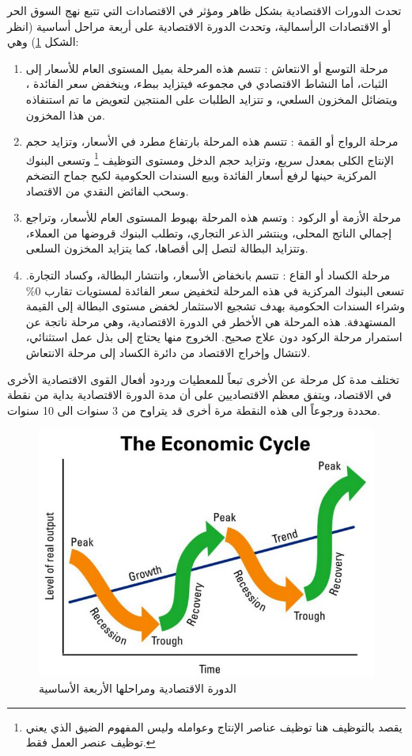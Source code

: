 تحدث الدورات الاقتصادية بشكل ظاهر ومؤثر في الاقتصادات التي تتبع نهج السوق الحر أو الاقتصادات الرأسمالية،
وتحدث الدورة الاقتصادية على أربعة مراحل أساسية
(انظر الشكل \ref{fig:trend}) وهي:
\begin{enumerate}
	\item 
	مرحلة التوسع أو الانتعاش  :
	تتسم هذه المرحلة بميل المستوى العام للأسعار إلى الثبات،
	أما النشاط الاقتصادي في مجموعه فيتزايد ببطء، وينخفض سعر الفائدة ، 
	ويتضائل المخزون السلعي، و تتزايد الطلبات على المنتجين لتعويض ما تم استنفاذه من هذا المخزون.
	\item 
	مرحلة الرواج أو القمة :
	تتسم هذه المرحلة بارتفاع مطرد في الأسعار،  وتزايد حجم الإنتاج الكلى بمعدل سريع، 
	وتزايد حجم الدخل ومستوى التوظيف%
	\footnote{
		يقصد بالتوظيف هنا توظيف عناصر الإنتاج وعوامله وليس المفهوم الضيق الذي يعني توظيف عنصر العمل فقط.
	}
	وتسعى البنوك المركزية حينها لرفع أسعار الفائدة وبيع السندات الحكومية لكبح جماح التضخم وسحب الفائض النقدي من الاقتصاد.
	\item 
	مرحلة الأزمة أو الركود :
	وتسم هذه المرحلة بهبوط المستوى العام للأسعار، وتراجع إجمالي الناتج المحلى،
	وينتشر الذعر التجاري، وتطلب البنوك قروضها من العملاء، وتتزايد البطالة لتصل إلى أقصاها، كما يتزايد المخزون السلعى.
	\item 
	مرحلة الكساد أو القاع :
	تتسم بانخفاض الأسعار، وانتشار البطالة، وكساد التجارة.
	تسعى البنوك المركزية في هذه المرحلة لتخفيض سعر الفائدة لمستويات تقارب 0\% وشراء السندات الحكومية
	بهدف تشجيع الاستثمار لخفض مستوى البطالة إلى القيمة المستهدفة.
	هذه المرحلة هي الأخطر في الدورة الاقتصادية، وهي مرحلة ناتجة عن استمرار مرحلة الركود دون علاج صحيح.
	الخروج منها يحتاج إلى بذل عمل استثنائي، لانتشال وإخراج الاقتصاد من دائرة الكساد إلى مرحلة الانتعاش.
\end{enumerate}
تختلف مدة كل مرحلة عن الأخرى تبعاً للمعطيات وردود أفعال القوى الاقتصادية الأخرى في الاقتصاد،
ويتفق معظم الاقتصاديين على أن مدة الدورة الاقتصادية بداية من نقطة محددة ورجوعاً الى هذه النقطة مرة أخرى قد يتراوح من 3 سنوات الى 10 سنوات.

\begin{figure}[htb]
	\centering
	\includegraphics[width=0.7\linewidth]{images/trend.PNG}
	\caption{الدورة الاقتصادية ومراحلها الأربعة الأساسية}
	\label{fig:trend}
\end{figure}


